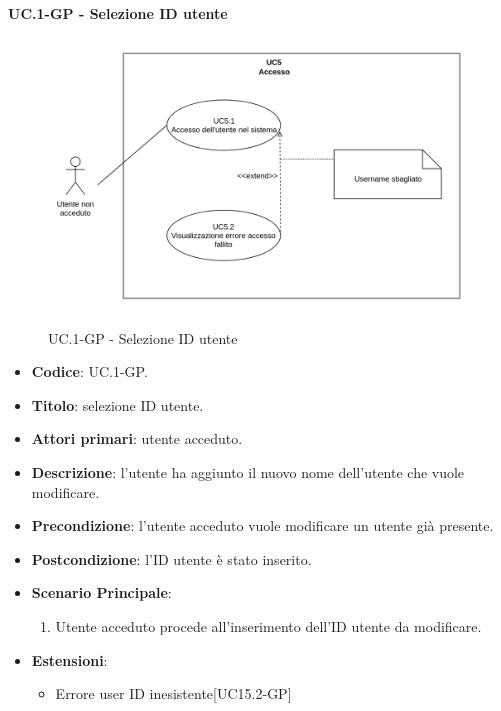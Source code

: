 	\paragraph{UC\theuccount.1-GP - Selezione ID utente}
		\begin{figure}[H]
			\centering
			\includegraphics[width=\columnwidth]{img/UC5.png}\\
			\caption{UC\theuccount.1-GP - Selezione ID utente}
		\end{figure}
		\begin{itemize}
			\item \textbf{Codice}: UC\theuccount.1-GP.
			\item \textbf{Titolo}: selezione ID utente.
			\item \textbf{Attori primari}: utente acceduto.
			\item \textbf{Descrizione}: l'utente ha aggiunto il nuovo nome dell'utente che vuole modificare.
			\item \textbf{Precondizione}: l'utente acceduto vuole modificare un utente già presente.
			\item \textbf{Postcondizione}: l'ID utente è stato inserito.
			\item \textbf{Scenario Principale}:
			\begin{enumerate}
				\item Utente acceduto procede all'inserimento dell'ID utente da modificare.
			\end{enumerate}
			\item \textbf{Estensioni}:
			\begin{itemize}
				\item Errore user ID inesistente[UC15.2-GP]
			\end{itemize}
		\end{itemize}
	
